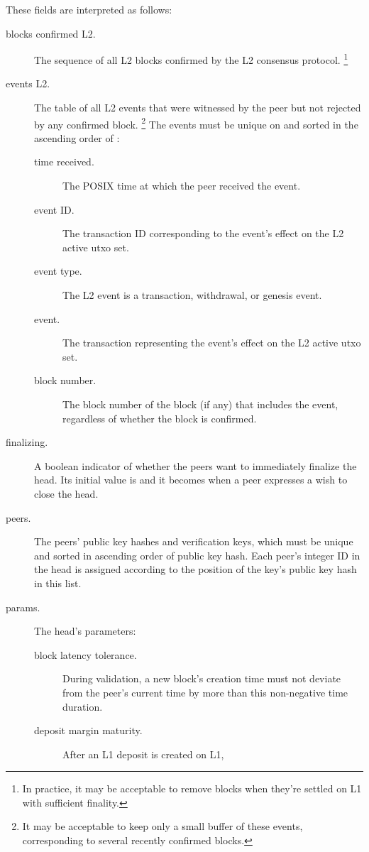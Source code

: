 \documentclass[../hydrozoa.tex]{subfiles}
\begin{document}
These fields are interpreted as follows:
\begin{description}
  \item[blocks confirmed L2.] The sequence of all L2 blocks confirmed by the L2 consensus protocol.%
    \footnote{In practice, it may be acceptable to remove blocks when they're settled on L1 with sufficient finality.}
  \item[events L2.] The table of all L2 events that were witnessed by the peer but not rejected by any confirmed block.%
    \footnote{It may be acceptable to keep only a small buffer of these events, corresponding to several recently confirmed blocks.}
    The events must be unique on  and sorted in the ascending order of :
    \begin{description}
      \item[time received.] The POSIX time at which the peer received the event.
      \item[event ID.] The transaction ID corresponding to the event's effect on the L2 active utxo set.
      \item[event type.] The L2 event is a transaction, withdrawal, or genesis event.
      \item[event.] The transaction representing the event's effect on the L2 active utxo set.
      \item[block number.] The block number of the block (if any) that includes the event, regardless of whether the block is confirmed.
    \end{description}
  \item[finalizing.] A boolean indicator of whether the peers want to immediately finalize the head.
    Its initial value is  and it becomes  when a peer expresses a wish to close the head.
  \item[peers.] The peers' public key hashes and verification keys, which must be unique and sorted in ascending order of public key hash.
    Each peer's integer ID in the head is assigned according to the position of the key's public key hash in this list.
  \item[params.] The head's parameters:
    \begin{description}
      \item[block latency tolerance.] During validation, a new block's creation time must not deviate from the peer's current time by more than this non-negative time duration.
      \item[deposit margin maturity.] After an L1 deposit is created on L1,%

\end{description}
\end{description}
\end{document}
